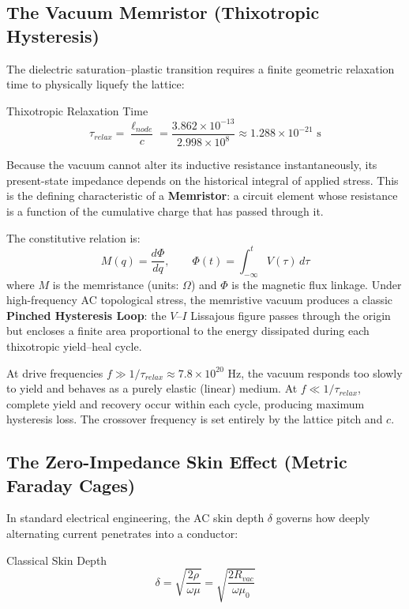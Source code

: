 \subsection{The Vacuum Memristor (Thixotropic Hysteresis)}

The dielectric saturation--plastic transition requires a finite geometric relaxation time to physically liquefy the lattice:
\begin{resultbox}{Thixotropic Relaxation Time}
\begin{equation}
    \tau_{relax} = \frac{\ell_{node}}{c} = \frac{3.862 \times 10^{-13}}{2.998 \times 10^{8}} \approx 1.288 \times 10^{-21} \text{ s}
    \label{eq:relaxation_time}
\end{equation}
\end{resultbox}

Because the vacuum cannot alter its inductive resistance instantaneously, its present-state impedance depends on the historical integral of applied stress. This is the defining characteristic of a \textbf{Memristor}: a circuit element whose resistance is a function of the cumulative charge that has passed through it.

The constitutive relation is:
\begin{equation}
    M(q) = \frac{d\Phi}{dq}, \qquad \Phi(t) = \int_{-\infty}^{t} V(\tau)\, d\tau
    \label{eq:memristor_constitutive}
\end{equation}
where $M$ is the memristance (units: $\Omega$) and $\Phi$ is the magnetic flux linkage. Under high-frequency AC topological stress, the memristive vacuum produces a classic \textbf{Pinched Hysteresis Loop}: the $V$--$I$ Lissajous figure passes through the origin but encloses a finite area proportional to the energy dissipated during each thixotropic yield--heal cycle.

At drive frequencies $f \gg 1/\tau_{relax} \approx 7.8 \times 10^{20}$ Hz, the vacuum responds too slowly to yield and behaves as a purely elastic (linear) medium. At $f \ll 1/\tau_{relax}$, complete yield and recovery occur within each cycle, producing maximum hysteresis loss. The crossover frequency is set entirely by the lattice pitch and $c$.

\subsection{The Zero-Impedance Skin Effect (Metric Faraday Cages)}

In standard electrical engineering, the AC skin depth $\delta$ governs how deeply alternating current penetrates into a conductor:
\begin{resultbox}{Classical Skin Depth}
\begin{equation}
    \delta = \sqrt{\frac{2\rho}{\omega\mu}} = \sqrt{\frac{2 R_{vac}}{\omega\mu_0}}
    \label{eq:skin_depth}
\end{equation}
\end{resultbox}

